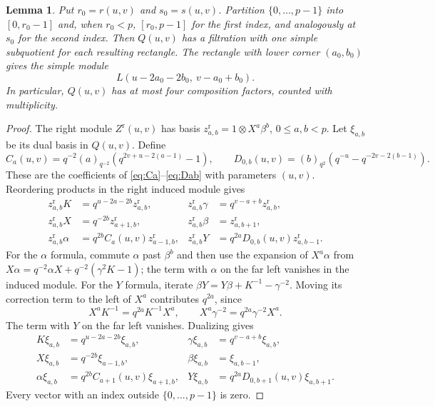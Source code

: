 \documentclass[10pt,oneside]{amsart}
\newtheorem{lemma}[proposition]{Lemma}
\theoremstyle{definition}
\begin{document}
\begin{lemma}\label{lem:dual-induced-rectangle-filtration}
Put $r_0=r(u,v)$ and $s_0=s(u,v)$. Partition $\{0,\ldots,p-1\}$
into $[0,r_0-1]$ and, when $r_0<p$, $[r_0,p-1]$ for the first
index, and analogously at $s_0$ for the second index.
Then $Q(u,v)$ has a filtration with one simple subquotient for
each resulting rectangle. The rectangle with lower corner
$(a_0,b_0)$ gives the simple module
\[
 L(u-2a_0-2b_0,\ v-a_0+b_0).
\]
In particular, $Q(u,v)$ has at most four composition factors,
counted with multiplicity.
\end{lemma}
\begin{proof}
The right module
$Z^{\mathrm r}(u,v)$ has basis $z^{\mathrm r}_{a,b}
=1\otimes X^a\beta^b$, $0\le a,b<p$. Let $\xi_{a,b}$ be its
dual basis in $Q(u,v)$. Define
\[
 C_a(u,v)=q^{-2}(a)_{q^{-2}}
             (q^{2v+u-2(a-1)}-1),\qquad
 D_{0,b}(u,v)=(b)_{q^2}(q^{-u}-q^{-2v-2(b-1)}).
\]
These are the coefficients of \eqref{eq:Ca}--\eqref{eq:Dab}
with parameters $(u,v)$. Reordering products in the right induced
module gives
\[
\begin{aligned}
 z^{\mathrm r}_{a,b}K&=q^{u-2a-2b}z^{\mathrm r}_{a,b},
 &z^{\mathrm r}_{a,b}\gamma&=q^{v-a+b}z^{\mathrm r}_{a,b},\\
 z^{\mathrm r}_{a,b}X&=q^{-2b}z^{\mathrm r}_{a+1,b},
 &z^{\mathrm r}_{a,b}\beta&=z^{\mathrm r}_{a,b+1},\\
 z^{\mathrm r}_{a,b}\alpha&=q^{2b}C_a(u,v)z^{\mathrm r}_{a-1,b},
 &z^{\mathrm r}_{a,b}Y&=q^{2a}D_{0,b}(u,v)z^{\mathrm r}_{a,b-1}.
\end{aligned}
\]
For the $\alpha$ formula, commute $\alpha$ past $\beta^b$
and then use the expansion of $X^a\alpha$ from
$X\alpha=q^{-2}\alpha X+q^{-2}(\gamma^2K-1)$; the term with
$\alpha$ on the far left vanishes in the induced module.
For the $Y$ formula, iterate
$\beta Y=Y\beta+K^{-1}-\gamma^{-2}$.
Moving its correction term to the left of $X^a$ contributes
$q^{2a}$, since
\[
 X^aK^{-1}=q^{2a}K^{-1}X^a,\qquad
 X^a\gamma^{-2}=q^{2a}\gamma^{-2}X^a.
\]
The term with $Y$ on the far left vanishes. Dualizing gives
\begin{equation}\label{eq:dual-right-induced-actions}
\begin{aligned}
 K\xi_{a,b}&=q^{u-2a-2b}\xi_{a,b},
 &\gamma\xi_{a,b}&=q^{v-a+b}\xi_{a,b},\\
 X\xi_{a,b}&=q^{-2b}\xi_{a-1,b},
 &\beta\xi_{a,b}&=\xi_{a,b-1},\\
 \alpha\xi_{a,b}&=q^{2b}C_{a+1}(u,v)\xi_{a+1,b},
 &Y\xi_{a,b}&=q^{2a}D_{0,b+1}(u,v)\xi_{a,b+1}.
\end{aligned}
\end{equation}
Every vector with an index outside $\{0,\ldots,p-1\}$ is zero.


\end{proof}
\end{document}
